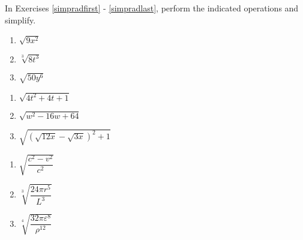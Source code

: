 \documentclass{ximera}
\begin{document}
	\author{Stitz-Zeager}



\label{ExercisesforAppRadEqus}

In Exercises \ref{simpradfirst} - \ref{simpradlast}, perform the indicated operations and simplify.

\begin{multicols}{3}
\begin{enumerate}

\item   $\sqrt{9x^2}$ \label{simpradfirst}

\item   $\sqrt[3]{8t^3}$

\item   $\sqrt{50y^6}$

\setcounter{HW}{\value{enumi}}
\end{enumerate}
\end{multicols}

\begin{multicols}{3}
\begin{enumerate}
\setcounter{enumi}{\value{HW}}

\item  $\sqrt{4t^2 + 4t + 1}$

\item  $\sqrt{w^2 - 16w + 64}$

\item  $\sqrt{(\sqrt{12x} - \sqrt{3x})^2+1}$

\setcounter{HW}{\value{enumi}}
\end{enumerate}
\end{multicols}

\begin{multicols}{3}
\begin{enumerate}
\setcounter{enumi}{\value{HW}}

\item  $\sqrt{\dfrac{c^2 - v^2}{c^2}}$

\item  $\sqrt[3]{\dfrac{24 \pi r^5}{L^3}}$

\item   $\sqrt[4]{\dfrac{32 \pi \varepsilon^8}{\rho^{12}}}$    

\setcounter{HW}{\value{enumi}}
\end{enumerate}
\end{multicols}
\end{document}
